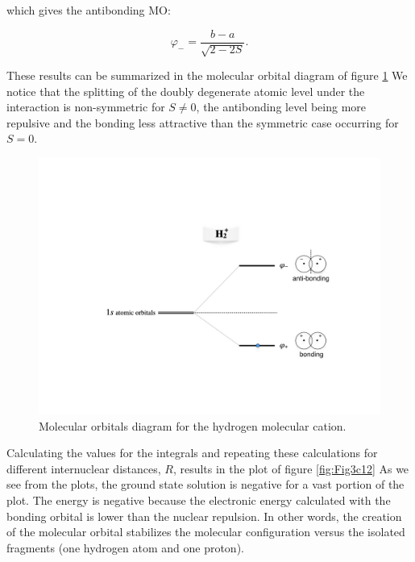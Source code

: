 \documentclass[
  9pt,
]{extbook}
\theoremstyle{definition}
\theoremstyle{definition}
\theoremstyle{definition}
\theoremstyle{remark}
\begin{document}
which gives the antibonding MO:

\begin{equation}
\varphi_{-}=\frac{b-a}{\sqrt{2-2S}}.
\label{eq:bond10}
\end{equation}

These results can be summarized in the molecular orbital diagram of figure \ref{fig:Fig2c12} We notice that the splitting of the doubly degenerate atomic level under the interaction is non-symmetric for \(S\neq0\), the antibonding level being more repulsive and the bonding less attractive than the symmetric case occurring for \(S = 0\).

\begin{figure}

{\centering \includegraphics[width=0.7\linewidth]{./img/OEP_figure2} 

}

\caption{Molecular orbitals diagram for the hydrogen molecular cation.}\label{fig:Fig2c12}
\end{figure}

Calculating the values for the integrals and repeating these calculations for different internuclear distances, \(R\), results in the plot of figure \ref{fig:Fig3c12} As we see from the plots, the ground state solution is negative for a vast portion of the plot. The energy is negative because the electronic energy calculated with the bonding orbital is lower than the nuclear repulsion. In other words, the creation of the molecular orbital stabilizes the molecular configuration versus the isolated fragments (one hydrogen atom and one proton).
\end{document}
